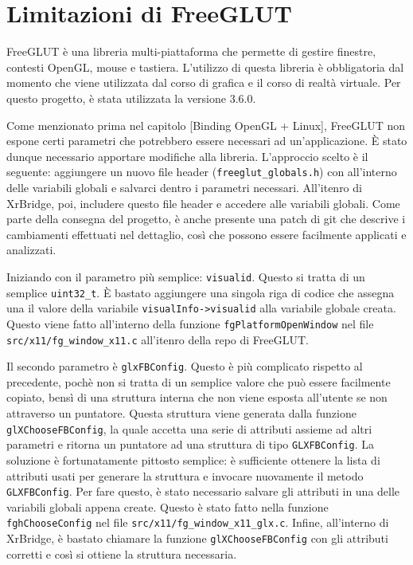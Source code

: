 \documentclass[twoside]{supsistudent}
\begin{document}
\section{Limitazioni di FreeGLUT}

FreeGLUT è una libreria multi-piattaforma che permette di gestire finestre, contesti OpenGL, mouse e tastiera. L'utilizzo di questa libreria è obbligatoria dal momento che viene utilizzata dal corso di grafica e il corso di realtà virtuale. Per questo progetto, è stata utilizzata la versione 3.6.0.


Come menzionato prima nel capitolo [Binding OpenGL + Linux], FreeGLUT non espone certi parametri che potrebbero essere necessari ad un'applicazione. È stato dunque necessario apportare modifiche alla libreria. L'approccio scelto è il seguente: aggiungere un nuovo file header (\texttt{freeglut\_globals.h}) con all'interno delle variabili globali e salvarci dentro i parametri necessari. All'itenro di XrBridge, poi, includere questo file header e accedere alle variabili globali. Come parte della consegna del progetto, è anche presente una patch di git che descrive i cambiamenti effettuati nel dettaglio, così che possono essere facilmente applicati e analizzati.

Iniziando con il parametro più semplice: \texttt{visualid}. Questo si tratta di un semplice \texttt{uint32\_t}. È bastato aggiungere una singola riga di codice che assegna una il valore della variabile \texttt{visualInfo->visualid} alla variabile globale creata. Questo viene fatto all'interno della funzione \texttt{fgPlatformOpenWindow} nel file \texttt{src/x11/fg\_window\_x11.c} all'itenro della repo di FreeGLUT.

Il secondo parametro è \texttt{glxFBConfig}. Questo è più complicato rispetto al precedente, pochè non si tratta di un semplice valore che può essere facilmente copiato, bensì di una struttura interna che non viene esposta all'utente se non attraverso un puntatore. Questa struttura viene generata dalla funzione \texttt{glXChooseFBConfig}, la quale accetta una serie di attributi assieme ad altri parametri e ritorna un puntatore ad una struttura di tipo \texttt{GLXFBConfig}. La soluzione è fortunatamente pittosto semplice: è sufficiente ottenere la lista di attributi usati per generare la struttura e invocare nuovamente il metodo \texttt{GLXFBConfig}. Per fare questo, è stato necessario salvare gli attributi in una delle variabili globali appena create. Questo è stato fatto nella funzione \texttt{fghChooseConfig} nel file \texttt{src/x11/fg\_window\_x11\_glx.c}. Infine, all'interno di XrBridge, è bastato chiamare la funzione \texttt{glXChooseFBConfig} con gli attributi corretti e così si ottiene la struttura necessaria.
\end{document}
